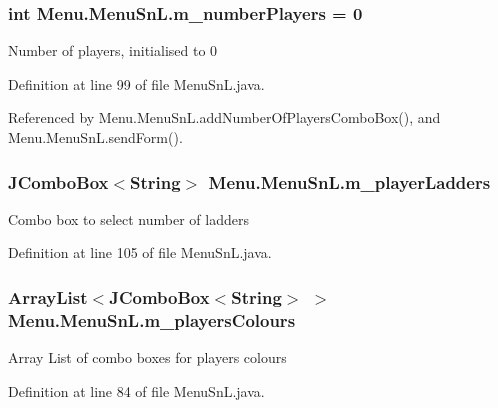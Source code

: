 \subsubsection[{m\+\_\+number\+Players}]{\setlength{\rightskip}{0pt plus 5cm}int Menu.\+Menu\+Sn\+L.\+m\+\_\+number\+Players = 0\hspace{0.3cm}{\ttfamily [private]}}\label{class_menu_1_1_menu_sn_l_afee3307aa062adfbee4edd14484c8f2c}
Number of players, initialised to 0 

Definition at line 99 of file Menu\+Sn\+L.\+java.



Referenced by Menu.\+Menu\+Sn\+L.\+add\+Number\+Of\+Players\+Combo\+Box(), and Menu.\+Menu\+Sn\+L.\+send\+Form().

\hypertarget{class_menu_1_1_menu_sn_l_a75cae58abbeef1dc893ab2214f84aaad}{}
\subsubsection[{m\+\_\+player\+Ladders}]{\setlength{\rightskip}{0pt plus 5cm}J\+Combo\+Box$<$String$>$ Menu.\+Menu\+Sn\+L.\+m\+\_\+player\+Ladders\hspace{0.3cm}{\ttfamily [private]}}\label{class_menu_1_1_menu_sn_l_a75cae58abbeef1dc893ab2214f84aaad}
Combo box to select number of ladders 

Definition at line 105 of file Menu\+Sn\+L.\+java.

\hypertarget{class_menu_1_1_menu_sn_l_a99b5b387a1ff9257d77534ebff7ca370}{}
\subsubsection[{m\+\_\+players\+Colours}]{\setlength{\rightskip}{0pt plus 5cm}Array\+List$<$J\+Combo\+Box$<$String$>$ $>$ Menu.\+Menu\+Sn\+L.\+m\+\_\+players\+Colours\hspace{0.3cm}{\ttfamily [private]}}\label{class_menu_1_1_menu_sn_l_a99b5b387a1ff9257d77534ebff7ca370}
Array List of combo boxes for player\textquotesingle{}s colours 

Definition at line 84 of file Menu\+Sn\+L.\+java.

